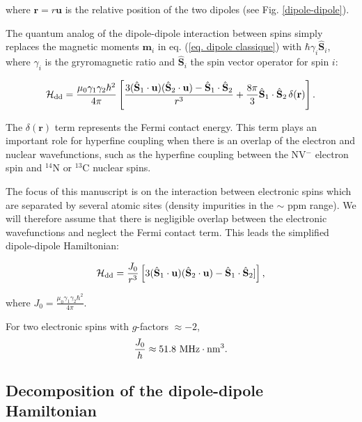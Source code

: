 \documentclass[a4paper,11pt]{report}
\begin{document}
where $\mathbf{r}=r \mathbf{u}$ is the relative position of the two dipoles (see Fig. \ref{dipole-dipole}). 

The quantum analog of the dipole-dipole interaction between spins simply replaces the magnetic moments $\mathbf{m}_i$ in eq. (\ref{eq. dipole classique}) with $\hbar \gamma_i \hat{\mathbf{S}}_i$, where $\gamma_i$ is the gryromagnetic ratio and $\hat{\mathbf{S}}_i$ the spin vector operator for spin $i$:

\begin{equation}
\mathcal{H}_{\rm dd}=\frac{\mu_0 \gamma_1 \gamma_2 \hbar^2}{4 \pi}\left[ \frac{3 (\hat{\mathbf{S}}_1\cdot\mathbf{u})(\hat{\mathbf{S}}_2\cdot\mathbf{u}) - \hat{\mathbf{S}}_1\cdot\hat{\mathbf{S}}_2}{r^3}+\frac{8\pi}{3}\hat{\mathbf{S}}_1\cdot\hat{\mathbf{S}}_2\,\delta(\mathbf{r})\right].
\end{equation}

The $\delta(\mathbf{r})$ term represents the Fermi contact energy. This term plays an important role for hyperfine coupling when there is an overlap of the electron and nuclear wavefunctions, such as the hyperfine coupling between the NV$^-$ electron spin and $^{14}$N \cite{doherty2012theory} or  $^{13}$C \cite{smeltzer201113c} nuclear spins.

The focus of this manuscript is on the interaction between electronic spins which are separated by several atomic sites (density impurities in the $\sim$ ppm range). We will therefore assume that there is negligible overlap between the electronic wavefunctions and neglect the Fermi contact term. This leads the simplified dipole-dipole Hamiltonian:

\begin{equation}
\mathcal{H}_{\rm dd}= \frac{J_0}{r^3}\left[ 3 (\hat{\mathbf{S}}_1\cdot\mathbf{u})(\hat{\mathbf{S}}_2\cdot\mathbf{u}) - \hat{\mathbf{S}}_1\cdot\hat{\mathbf{S}}_2] \right],
\end{equation}

where $J_0=\frac{\mu_0 \gamma_1 \gamma_2 \hbar^2}{4 \pi}$.

For two electronic spins with $g$-factors $\approx -2$, 
\begin{equation*}
\frac{J_0}{h} \approx 51.8\ \rm{MHz}\cdot \rm{nm}^3.
\end{equation*}

\subsection{Decomposition of the dipole-dipole Hamiltonian}
\end{document}
